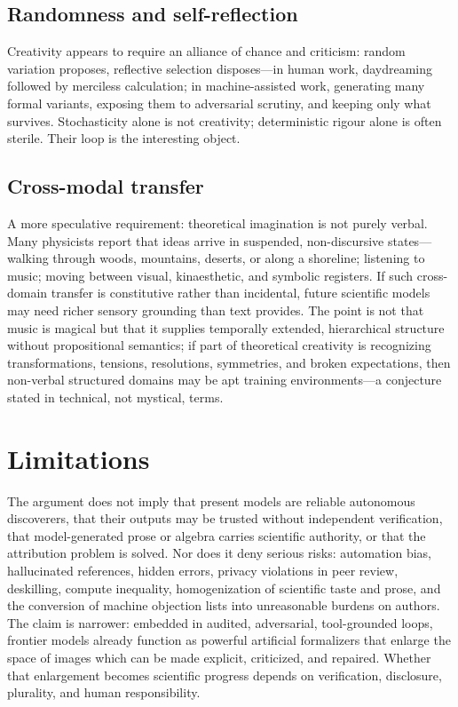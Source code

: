 \documentclass[
  aps,
  reprint,
  superscriptaddress,
  floatfix,
  nofootinbib,
  longbibliography
]{revtex4-2}
\begin{document}
\subsection{Randomness and self-reflection}

Creativity appears to require an alliance of chance and criticism: random
variation proposes, reflective selection disposes---in human work, daydreaming
followed by merciless calculation; in machine-assisted work, generating many
formal variants, exposing them to adversarial scrutiny, and keeping only what
survives. Stochasticity alone is not creativity; deterministic rigour alone is
often sterile. Their loop is the interesting object.

\subsection{Cross-modal transfer}

A more speculative requirement: theoretical imagination is not purely verbal.
Many physicists report that ideas arrive in suspended, non-discursive
states---walking through woods, mountains, deserts, or along a shoreline;
listening to music; moving between visual, kinaesthetic, and symbolic registers.
If such cross-domain transfer is constitutive rather than incidental, future
scientific models may need richer sensory grounding than text provides. The point
is not that music is magical but that it supplies temporally extended,
hierarchical structure without propositional semantics; if part of theoretical
creativity is recognizing transformations, tensions, resolutions, symmetries, and
broken expectations, then non-verbal structured domains may be apt training
environments---a conjecture stated in technical, not mystical, terms.

\section{Limitations}
\label{sec:limitations}

The argument does not imply that present models are reliable autonomous
discoverers, that their outputs may be trusted without independent verification,
that model-generated prose or algebra carries scientific authority, or that the
attribution problem is solved. Nor does it deny serious risks: automation bias,
hallucinated references, hidden errors, privacy violations in peer review,
deskilling, compute inequality, homogenization of scientific taste and prose,
and the conversion of machine objection lists into unreasonable burdens on
authors. The claim is narrower: embedded in audited, adversarial,
tool-grounded loops,
frontier models already function as powerful artificial formalizers that enlarge
the space of images which can be made explicit, criticized, and repaired. Whether
that enlargement becomes scientific progress depends on verification, disclosure,
plurality, and human responsibility.
\end{document}
